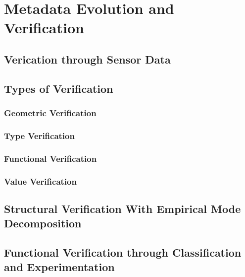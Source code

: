 

\chapter{Metadata Evolution and Verification}
\section{Verication through Sensor Data}

\section{Types of Verification}
\subsection{Geometric Verification}
\subsection{Type Verification}
\subsection{Functional Verification}
\subsection{Value Verification}

\section{Structural Verification With Empirical Mode Decomposition}









\section{Functional Verification through Classification and Experimentation}










